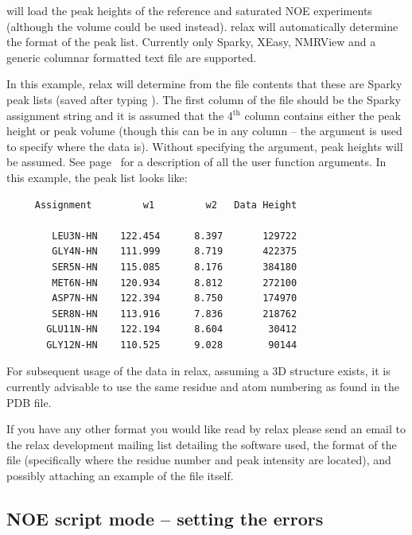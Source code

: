 will load the peak heights of the reference and saturated NOE experiments (although the volume could be used instead).
relax will automatically determine the format of the peak list.
Currently only Sparky, XEasy, NMRView and a generic columnar formatted text file are supported.

In this example, relax will determine from the file contents that these are Sparky peak lists (saved after typing ).
The first column of the file should be the Sparky assignment string and it is assumed that the 4$^{\textrm{th}}$ column contains either the peak height or peak volume (though this can be in any column -- the  argument is used to specify where the data is).
Without specifying the  argument, peak heights will be assumed.
See page~\pageref{uf: spectrum.read_intensities} for a description of all the  user function arguments.
In this example, the peak list looks like:

{\footnotesize \begin{verbatim}
     Assignment         w1         w2   Data Height

        LEU3N-HN    122.454      8.397       129722
        GLY4N-HN    111.999      8.719       422375
        SER5N-HN    115.085      8.176       384180
        MET6N-HN    120.934      8.812       272100
        ASP7N-HN    122.394      8.750       174970
        SER8N-HN    113.916      7.836       218762
       GLU11N-HN    122.194      8.604        30412
       GLY12N-HN    110.525      9.028        90144
\end{verbatim}}

For subsequent usage of the data in relax, assuming a 3D structure exists, it is currently advisable to use the same residue and atom numbering as found in the PDB file.

If you have any other format you would like read by relax please send an email to the relax development mailing list detailing the software used, the format of the file (specifically where the residue number and peak intensity are located), and possibly attaching an example of the file itself.




\subsection{NOE script mode -- setting the errors}

